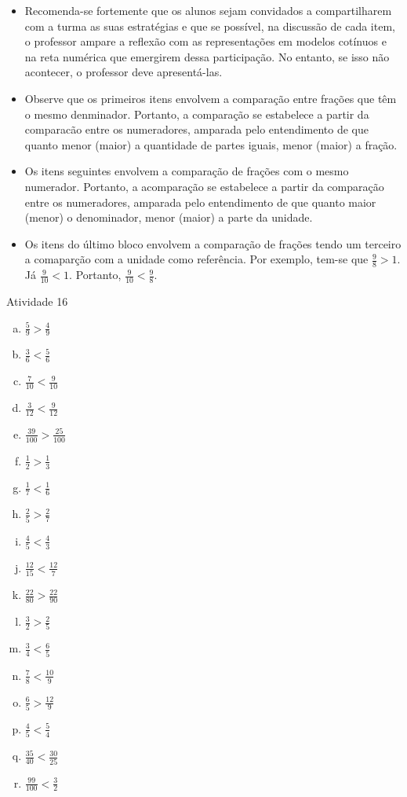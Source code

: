 \begin{multicols}{2}
\begin{itemize}
   \item Recomenda-se fortemente que os alunos sejam convidados a compartilharem com a turma as suas estratégias e que se possível, na discussão de cada item, o professor ampare a reflexão com as representações em modelos cotínuos e na reta numérica que emergirem dessa participação. No entanto, se isso não acontecer, o professor deve apresentá-las.  
   \item Observe que os primeiros itens envolvem a comparação entre frações que têm o mesmo denminador. Portanto, a comparação se estabelece a partir da comparacão entre os numeradores, amparada pelo entendimento de que quanto menor (maior) a quantidade de partes iguais, menor (maior) a fração.
   \item Os itens seguintes envolvem a comparação de frações com o mesmo numerador. Portanto, a acomparação se estabelece a partir da comparação entre os numeradores, amparada pelo entendimento de que quanto maior (menor) o denominador, menor (maior) a parte da unidade.
   \item Os itens do último bloco envolvem a comparação de frações tendo um terceiro a comaparção com a unidade como referência. Por exemplo, tem-se que $\frac{9}{8} > 1$. Já $\frac{9}{10} < 1$. Portanto, $\frac{9}{10}<\frac{9}{8}$.
\end{itemize}

\begin{resposta*}{Atividade 16}
\begin{enumerate}[a)]
 \item $\frac{5}{9} > \frac{4}{9}$ 
 \item $\frac{3}{6} < \frac{5}{6}$
\item   $\frac{7}{10} < \frac{9}{10}$    
\item  $\frac{3}{12} < \frac{9}{12}$    
\item $\frac{39}{100} > \frac{25}{100}$ 

\item   $\frac{1}{2} > \frac{1}{3}$     
\item  $\frac{1}{7} < \frac{1}{6}$     
\item   $\frac{2}{5} > \frac{2}{7}$    
\item   $\frac{4}{5} < \frac{4}{3}$    
\item   $\frac{12}{15} < \frac{12}{7}$ 
\item   $\frac{22}{80} > \frac{22}{90}$

\item   $\frac{3}{2} > \frac{2}{5}$    
\item   $\frac{3}{4} < \frac{6}{5}$    
\item   $\frac{7}{8} < \frac{10}{9}$   
\item   $\frac{6}{5} > \frac{12}{9}$   
\item  $\frac{4}{5}< \frac{5}{4}$     
\item  $\frac{35}{40}< \frac{30}{25}$ 
\item  $\frac{99}{100}<\frac{3}{2}$   
\end{enumerate}
\end{resposta*}



\end{multicols}
